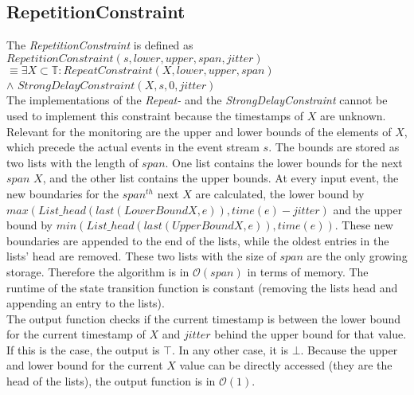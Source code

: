 \subsection{RepetitionConstraint}
	The  \emph{RepetitionConstraint} is defined as\\[10pt]
		$RepetitionConstraint(s, lower, upper, span, jitter)$\\
		$\equiv \exists X\subset \mathbb{T}: RepeatConstraint (X, lower, upper, span)$\\
		\hspace{7cm}$\land$ $StrongDelayConstraint(X, s, 0, jitter)$\\[10pt]
	The implementations of the \emph{Repeat-} and the \emph{StrongDelayConstraint} cannot be used to implement this constraint because the timestamps of $X$ are unknown.\\
	Relevant for the monitoring are the upper and lower bounds of the elements of $X$, which precede the actual events in the event stream $s$. The bounds are stored as two lists with the length of $span$. One list contains the lower bounds for the next $span$ $X$, and the other list contains the upper bounds. At every input event, the new boundaries for the $span^{th}$ next $X$ are calculated, the lower bound by $max(List\_head(last(LowerBoundX, e)), time(e)-jitter)$ and the upper bound by $min(List\_head(last(UpperBoundX, e)), time(e))$. These new boundaries are appended to the end of the lists, while the oldest entries in the lists' head are removed. These two lists with the size of $span$ are the only growing storage. Therefore the algorithm is in $\mathcal{O}(span)$ in terms of memory. The runtime of the state transition function is constant (removing the lists head and appending an entry to the lists).\\
	The output function checks if the current timestamp is between the lower bound for the current timestamp of $X$ and $jitter$ behind the upper bound for that value. If this is the case, the output is $\top$. In any other case, it is $\bot$. Because the upper and lower bound for the current $X$ value can be directly accessed (they are the head of the lists), the output function is in $\mathcal{O}(1)$.
	
